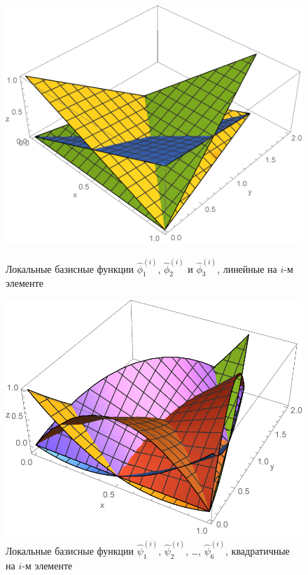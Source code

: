 \begin{figure}[!h]
	\includegraphics[width=\linewidth]{img/localBasis.pdf}
	\caption{Локальные базисные функции $\hat{\phi}^{(i)}_1$, $\hat{\phi}^{(i)}_2$ и $\hat{\phi}^{(i)}_3$, линейные на $i$-м элементе}\label{fig:localBasis}
	\endminipage\hfill
	\includegraphics[width=\linewidth]{img/localQuadBasis.pdf}
	\caption{Локальные базисные функции $\hat{\psi}^{(i)}_1$, $\hat{\psi}^{(i)}_2$, \dots, $\hat{\psi}^{(i)}_6$, квадратичные на $i$-м элементе}\label{fig:localQuadBasis}
	\endminipage
\end{figure}

